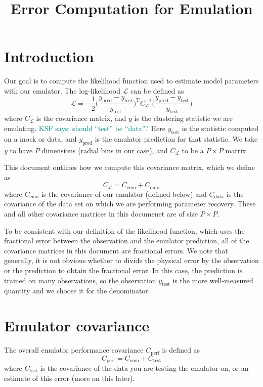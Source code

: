 \documentclass[12pt]{article}
\title{Error Computation for Emulation}
\newcommand{\T}{^{\mathrm{T}}}
\newcommand{\inv}{^{-1}}
\newcommand{\like}{\mathcal{L}}
\newcommand{\cov}[1]{C_\text{#1}}
\newcommand{\covtot}{C_\like}
\newcommand{\y}[1]{y_{\text{#1}}}
\newcommand{\KSF}[1]{\textcolor{teal}{KSF says: #1}}
\begin{document}
\maketitle


\section{Introduction}

Our goal is to compute the likelihood function used to estimate model parameters with our emulator.
The log-likelihood $\like$ can be defined as 
\begin{equation}
    \like = -\frac{1}{2} \bigg( \frac{\y{pred} - \y{test}}{\y{test}} \bigg)\T \covtot\inv \bigg( \frac{\y{pred} - \y{test}}{\y{test}} \bigg)
\end{equation}
where $\covtot$ is the covariance matrix, and $y$ is the clustering statistic we are emulating.
\KSF{should ``test'' be ``data''?}
Here $\y{test}$ is the statistic computed on a mock or data, and $\y{pred}$ is the emulator prediction for that statistic. 
We take $y$ to have $P$ dimensions (radial bins in our case), and $\covtot$ to be a $P \times P$ matrix.

This document outlines how we compute this covariance matrix, which we define as
\label{eq:covtot}
\begin{equation}
    \covtot = \cov{emu} + \cov{data}
\end{equation}
where $\cov{emu}$ is the covariance of our emulator (defined below) and $\cov{data}$ is the covariance of the data set on which we are performing parameter recovery.
These and all other covariance matrices in this documenet are of size $P \times P$.

To be consistent with our definition of the likelihood function, which uses the fractional error between the observation and the emulator prediction, all of the covariance matrices in this document are fractional errors.
We note that generally, it is not obvious whether to divide the physical error by the observation or the prediction to obtain the fractional error.
In this case, the prediction is trained on many observations, so the observation $\y{test}$ is the more well-measured quantity and we choose it for the denominator.


\section{Emulator covariance}

The overall emulator performance covariance $\cov{perf}$ is defined as
\begin{equation}
    \cov{perf} = \cov{emu} + \cov{test}
\end{equation}
where $\cov{test}$ is the covariance of the data you are testing the emulator on, or an estimate of this error (more on this later).
\end{document}
